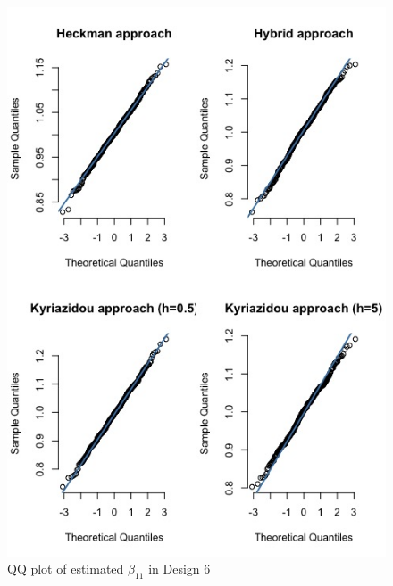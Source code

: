 \begin{figure}[htbp]
  \vspace{-2.5em}%
  \begin{adjustwidth}{-.5in}{-.5in}
  \centerline{\includegraphics[scale=.4]{content/Figures/QQ_beta_11_Design6.png}}
  \caption{\footnotesize{QQ plot of estimated $\beta_{11}$ in Design 6}}
  \label{QQ_beta_11_Design6}
  \end{adjustwidth}
\end{figure}
